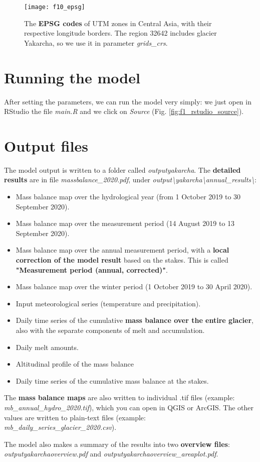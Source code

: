 \documentclass[15pt]{extarticle}
\begin{document}
\begin{figure}[ht!]
    \centering
    \texttt{[image: f10\_epsg]}
    \caption{The \textbf{EPSG codes} of UTM zones in Central Asia, with their respective longitude borders. The region 32642 includes glacier Yakarcha, so we use it in parameter \textit{grids\_crs}.}
    \label{fig:f10_epsg}
\end{figure}



\section{Running the model}
After setting the parameters, we can run the model very simply: we just open in RStudio the file \textit{main.R} and we click on \textit{Source} (Fig. \ref{fig:f1_rstudio_source}).



\section{Output files}
The model output is written to a folder called \textit{output\textunderscore yakarcha}. The \textbf{detailed results} are in file \textit{massbalance\_2020.pdf}, under \textit{output\textbackslash yakarcha\textbackslash annual\_results\textbackslash}:

\begin{itemize}
    \item Mass balance map over the hydrological year (from 1 October 2019 to 30 September 2020).
    \item Mass balance map over the measurement period (14 August 2019 to 13 September 2020).
    \item Mass balance map over the annual measurement period, with a \textbf{local correction of the model result} based on the stakes. This is called \textbf{"Measurement period (annual, corrected)"}.
    \item Mass balance map over the winter period (1 October 2019 to 30 April 2020).
    \item Input meteorological series (temperature and precipitation).
    \item Daily time series of the cumulative \textbf{mass balance over the entire glacier}, also with the separate components of melt and accumulation.
    \item Daily melt amounts.
    \item Altitudinal profile of the mass balance
    \item Daily time series of the cumulative mass balance at the stakes.
\end{itemize}

The \textbf{mass balance maps} are also written to individual .tif files (example: \textit{mb\_annual\_hydro\_2020.tif}), which you can open in QGIS or ArcGIS. The other values are written to plain-text files (example: \textit{mb\_daily\_series\_glacier\_2020.csv}).

The model also makes a summary of the results into two \textbf{overview files}: \textit{output\textunderscore yakarcha\textunderscore overview.pdf} and \textit{output\textunderscore yakarcha\textunderscore overview\_areaplot.pdf}.
\end{document}

